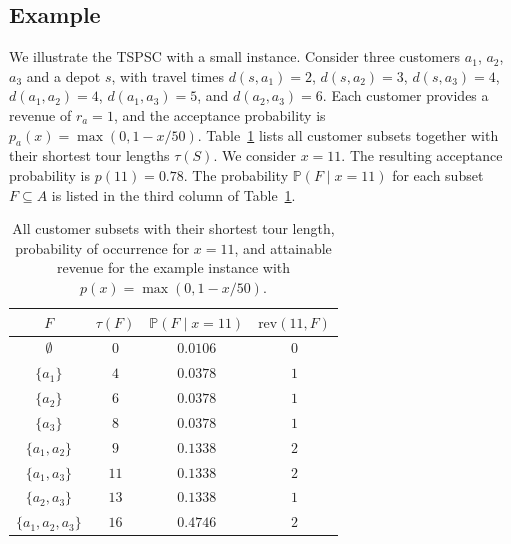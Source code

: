 \documentclass[11pt]{article}
\theoremstyle{plain}
\theoremstyle{definition}
\begin{document}
	\subsection{Example}\label{sec:example}
	
	We illustrate the \ac{TSPSC} with a small instance. Consider three customers $a_1$, $a_2$, $a_3$ and a depot $s$, with travel times $d(s,a_1)=2$, $d(s,a_2)=3$, $d(s,a_3)=4$, $d(a_1,a_2)=4$, $d(a_1,a_3)=5$, and $d(a_2,a_3)=6$. Each customer provides a revenue of $r_a = 1$, and the acceptance probability is $p_a(x) = \max(0, 1 - x/50)$. Table~\ref{tab:subset_tourlengths} lists all customer subsets together with their shortest tour lengths $\tau(S)$.
	We consider $x = 11$. The resulting acceptance probability is $p(11) = 0.78$. The probability $\mathbb{P}(F \mid x = 11)$ for each subset $F \subseteq A$ is listed in the third column of Table~\ref{tab:subset_tourlengths}.
	
	\begin{table}[h]
		\centering
		\begin{tabular}{c|c|c|c}
			$F$ & $\tau(F)$ & $\mathbb{P}(F\mid x=11)$ & $\text{rev}(11, F)$\\\hline
			$\emptyset$ & $0$ & $0.0106$ & $0$\\
			$\{a_1\}$ & $4$ & $0.0378$ & $1$\\
			$\{a_2\}$ & $6$ & $0.0378$ & $1$\\
			$\{a_3\}$ & $8$ & $0.0378$ & $1$\\
			$\{a_1,a_2\}$ & $9$ & $0.1338$ & $2$\\
			$\{a_1,a_3\}$ & $11$ & $0.1338$ & $2$\\
			$\{a_2,a_3\}$ & $13$ & $0.1338$ & $1$\\
			$\{a_1,a_2,a_3\}$ & $16$ & $0.4746$ & $2$\\
		\end{tabular}
		\caption{All customer subsets with their shortest tour length, probability of occurrence for $x = 11$, and attainable revenue for the example instance with $p(x) = \max(0, 1 - x/50)$.}
		\label{tab:subset_tourlengths}
	\end{table}
	
\end{document}
